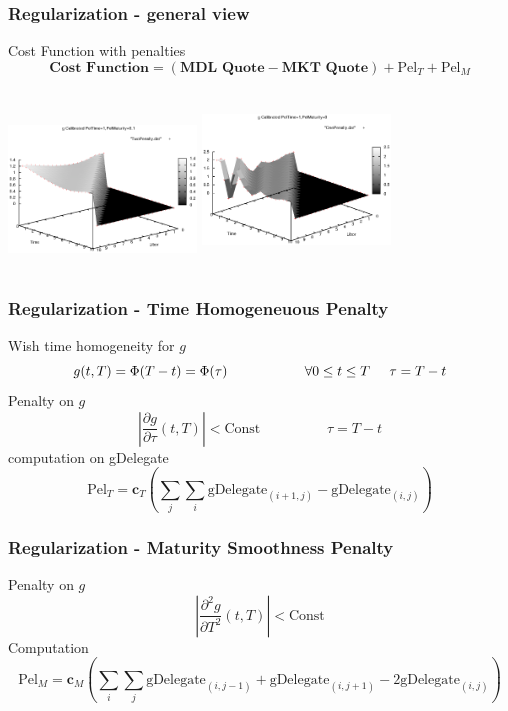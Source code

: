 \documentclass[8pt]{beamer}
\begin{document}
\begin{frame}
\frametitle{Regularization - general view}
Cost Function with penalties
\[
	\textbf{Cost Function} = (\textbf{MDL Quote} - \textbf{MKT Quote}) + \text{Pel}_{T} + \text{Pel}_{M}
\]
\begin{columns}[t]
\centering
\includegraphics[width=5cm,height=3.5cm]{PenaltyTwo}
\centering
\includegraphics[width=5cm,height=4cm]{PenaltyOne}
\end{columns}
\end{frame}

\begin{frame}
\frametitle{Regularization - Time Homogeneuous Penalty}
Wish time homogeneity for $g$
\[
g(t,T) = \Phi(T-t) = \Phi(\tau)   \hspace{2cm} \forall 0 \leq t \leq T \hspace{0.5cm} \tau = T-t
\]
Penalty on $g$
\[
 |\frac{\partial g}{\partial \tau}(t,T) | < \text{Const} \hspace{2cm} \tau = T-t
\]
computation on gDelegate
\[
\text{Pel}_{T} = \textbf{c}_{T}(\sum_j \sum_i \text{gDelegate}_{(i+1,j)} - \text{gDelegate}_{(i,j)} )
\]
\end{frame}

\begin{frame}
\frametitle{Regularization - Maturity Smoothness Penalty}
Penalty on $g$
\[
 |\frac{\partial^2 g}{\partial T^2}(t,T) | < \text{Const}
\]
Computation
\[
\text{Pel}_{M} = \textbf{c}_{M} (\sum_i \sum_j \text{gDelegate}_{(i,j-1)} + \text{gDelegate}_{(i,j+1)} - 2 \text{gDelegate}_{(i,j)} )
\]
\end{frame}
\end{document}
